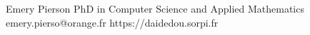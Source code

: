 \CVHeader
  {Emery Pierson}
  {PhD in Computer Science and Applied Mathematics}
  {emery.pierso@orange.fr}
  {https://daidedou.sorpi.fr}

